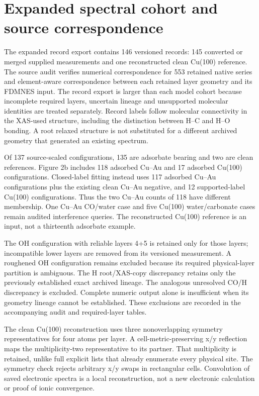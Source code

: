 \clearpage
\section{Expanded spectral cohort and source correspondence}
The expanded record export contains 146 versioned records: 145 converted or merged supplied measurements and one reconstructed clean Cu(100) reference. The source audit verifies numerical correspondence for 553 retained native series and element-aware correspondence between each retained layer geometry and its FDMNES input. The record export is larger than each model cohort because incomplete required layers, uncertain lineage and unsupported molecular identities are treated separately. Record labels follow molecular connectivity in the XAS-used structure, including the distinction between H--C and H--O bonding. A root relaxed structure is not substituted for a different archived geometry that generated an existing spectrum.

Of 137 source-scaled configurations, 135 are adsorbate bearing and two are clean references. Figure 2b includes 118 adsorbed Cu--Au and 17 adsorbed Cu(100) configurations. Closed-label fitting instead uses 117 adsorbed Cu--Au configurations plus the existing clean Cu--Au negative, and 12 supported-label Cu(100) configurations. Thus the two Cu--Au counts of 118 have different membership. One Cu--Au CO/water case and five Cu(100) water/carbonate cases remain audited interference queries. The reconstructed Cu(100) reference is an input, not a thirteenth adsorbate example.

The OH configuration with reliable layers 4+5 is retained only for those layers; incompatible lower layers are removed from its versioned measurement. A roughened OH configuration remains excluded because its required physical-layer partition is ambiguous. The H root/XAS-copy discrepancy retains only the previously established exact archived lineage. The analogous unresolved CO/H discrepancy is excluded. Complete numeric output alone is insufficient when its geometry lineage cannot be established. These exclusions are recorded in the accompanying audit and required-layer tables.

The clean Cu(100) reconstruction uses three nonoverlapping symmetry representatives for four atoms per layer. A cell-metric-preserving x/y reflection maps the multiplicity-two representative to its partner. That multiplicity is retained, unlike full explicit lists that already enumerate every physical site. The symmetry check rejects arbitrary x/y swaps in rectangular cells. Convolution of saved electronic spectra is a local reconstruction, not a new electronic calculation or proof of ionic convergence.

